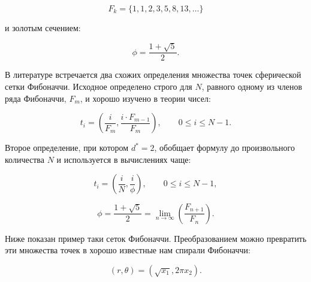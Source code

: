\documentclass[12pt, a4paper]{article}
\begin{document}
\begin{displaymath}
	F_k = \{1, 1, 2, 3, 5, 8, 13, \ldots \}
\end{displaymath}

\noindent и золотым сечением:

\begin{displaymath}
	\phi = \frac{1 + \sqrt{5}}{2}.
\end{displaymath}

В литературе встречается два схожих определения множества точек сферической сетки Фибоначчи. Исходное определено строго для $N$, равного одному из членов ряда Фибоначчи, $F_m$, и хорошо изучено в теории чисел:

\begin{displaymath}
	t_i = \left( \frac{i}{F_m}, \frac{i \cdot F_{m-1}}{F_m} \right),
	\qquad
	0 \leq i \leq N-1.
\end{displaymath}

Второе определение, при котором $d^* = 2$, обобщает формулу до произвольного количества $N$ и используется в вычислениях чаще:

\begin{displaymath}
	t_i = \left( \frac{i}{N}, \frac{i}{\phi} \right),
	\qquad
	0 \leq i \leq N-1,
	\tag{1}
\end{displaymath}

\begin{displaymath}
	\phi = \frac{1 + \sqrt{5}}{2} = \lim_{n \rightarrow \infty} \left( \frac{F_{n+1}}{F_n} \right).
\end{displaymath}

Ниже показан пример таки сеток Фибоначчи. Преобразованием можно превратить эти множества точек в хорошо известные нам спирали Фибоначчи:

\begin{displaymath}
	(r, \theta) = (\sqrt{x_1}, 2 \pi x_2).
\end{displaymath}
\end{document}
